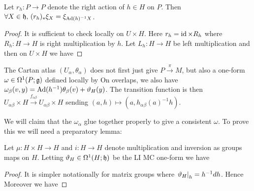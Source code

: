 \documentclass{article}
\begin{document}
\begin{lemma}
Let $r_h : P \to  P$ denote the right action of $h \in H$ on $P$. Then $\forall X \in \mathfrak{h}, \, (r_h)_\ast \xi_X = \xi_{\operatorname{Ad}(h)^{-1}X}$. 
\end{lemma}
\begin{proof}
It is sufficient to check locally on $U \times H$. Here $r_h = \operatorname{id} \times R_h$ where $R_h : H \to H$ is right multiplication by $h$. Let $L_h : H \to H$ be left multiplication and then on $U \times H$ we have 
\end{proof}

The Cartan atlas $(U_\alpha,\theta_\alpha)$ does not first just give $P \overset{\pi}{\to} M$, but also a one-form $\omega \in \Omega^1(P;\mathfrak{g})$ defined locally by 
On overlaps, we also have $\omega_\beta(v,y) = \operatorname{Ad}(h^{-1}) \theta_\beta(v) + \vartheta_H(y)$. The transition function is then $U_{\alpha\beta} \times H \overset{f_{\alpha\beta}}{\to} U_{\alpha\beta} \times H$ sending $(a,h) \mapsto (a,h_{\alpha\beta}(a)^{-1}h)$. 

We will claim that the $\omega_\alpha$ glue together properly to give a consistent $\omega$. To prove this we will need a preparatory lemma: 

\begin{lemma}
Let $\mu: H \times H \to H$ and $i: H \to H$ denote multiplication and inversion as groups maps on $H$. Letting $\vartheta_H \in \Omega^1(H;\mathfrak{h})$ be the LI MC one-form we have 
\end{lemma}
\begin{proof}
It is simpler notationally for matrix groups where $\left. \vartheta_H \right\rvert_{h} = h^{-1}dh$. Hence 
Moreover we have 
\end{proof}
\end{document}
